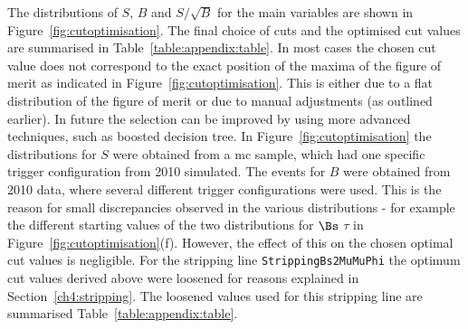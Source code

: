 \newline The distributions of $S$, $B$ and $S/\sqrt{B}$ for the main variables are shown in Figure~\ref{fig:cutoptimisation}. The final choice of cuts and the optimised cut values are summarised in Table~\ref{table:appendix:table}. In most cases the chosen cut value does not correspond to the exact position of the maxima of the figure of merit as indicated in Figure~\ref{fig:cutoptimisation}. This is either due to a flat distribution of the figure of merit or due to manual adjustments (as outlined earlier). In future the selection can be improved by using more advanced techniques, such as boosted decision tree.
\newline In Figure~\ref{fig:cutoptimisation} the distributions for $S$ were obtained from a \ac{mc} sample, which had one specific trigger configuration from 2010 simulated. The events for $B$ were obtained from 2010 data, where several different trigger configurations were used. This is the reason for small discrepancies observed in the various distributions - for example the different starting values of the two distributions for $\Bs$ $\tau$ in Figure~\ref{fig:cutoptimisation}(f). However, the effect of this on the chosen optimal cut values is negligible.       
\newline For the stripping line \texttt{StrippingBs2MuMuPhi} the optimum cut values derived above were loosened for reasons explained in Section~\ref{ch4:stripping}. The loosened values used for this stripping line are summarised Table~\ref{table:appendix:table}.\\\\
